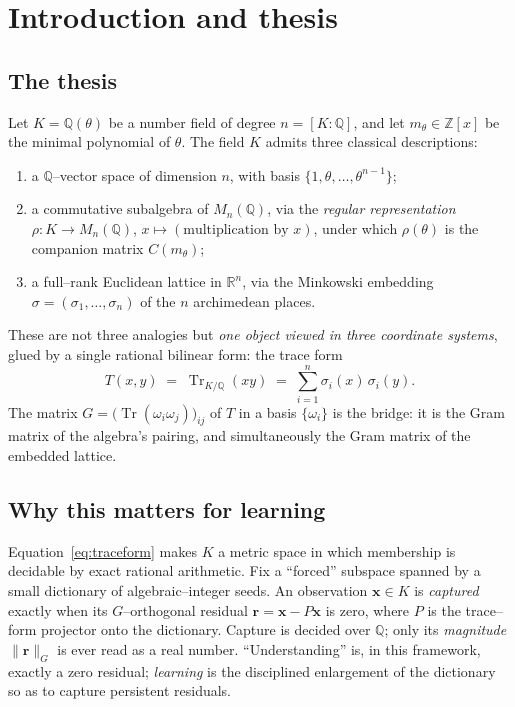 \documentclass[11pt]{article}
\theoremstyle{plain}
\theoremstyle{definition}
\theoremstyle{remark}
\newcommand{\Q}{\mathbb{Q}}
\newcommand{\Z}{\mathbb{Z}}
\newcommand{\R}{\mathbb{R}}
\newcommand{\K}{K}
\newcommand{\Tr}{\operatorname{Tr}}
\newcommand{\rr}{\mathbf{r}}
\newcommand{\xx}{\mathbf{x}}
\newcommand{\GG}{G}
\begin{document}
\tableofcontents

\section{Introduction and thesis}\label{sec:intro}

\subsection*{The thesis}
Let $\K=\Q(\theta)$ be a number field of degree $n=[\K:\Q]$, and let $m_\theta\in\Z[x]$ be the minimal
polynomial of $\theta$. The field $\K$ admits three classical descriptions:
\begin{enumerate}[label=(\roman*)]
  \item a $\Q$--vector space of dimension $n$, with basis $\{1,\theta,\dots,\theta^{n-1}\}$;
  \item a commutative subalgebra of $M_n(\Q)$, via the \emph{regular representation}
        $\rho\colon \K\to M_n(\Q)$, $x\mapsto(\text{multiplication by }x)$, under which $\rho(\theta)$ is
        the companion matrix $C(m_\theta)$;
  \item a full--rank Euclidean lattice in $\R^n$, via the Minkowski embedding
        $\sigma=(\sigma_1,\dots,\sigma_n)$ of the $n$ archimedean places.
\end{enumerate}
These are not three analogies but \emph{one object viewed in three coordinate systems}, glued by a single
rational bilinear form: the trace form
\begin{equation}\label{eq:traceform}
  T(x,y) \;=\; \Tr_{\K/\Q}(xy) \;=\; \sum_{i=1}^{n}\sigma_i(x)\,\sigma_i(y).
\end{equation}
The matrix $\GG=\big(\Tr(\omega_i\omega_j)\big)_{ij}$ of $T$ in a basis $\{\omega_i\}$ is the bridge: it is
the Gram matrix of the algebra's pairing, and simultaneously the Gram matrix of the embedded lattice.

\subsection*{Why this matters for learning}
Equation~\eqref{eq:traceform} makes $\K$ a metric space in which membership is decidable by exact rational
arithmetic. Fix a ``forced'' subspace spanned by a small dictionary of algebraic--integer seeds. An
observation $\xx\in\K$ is \emph{captured} exactly when its $\GG$--orthogonal residual $\rr=\xx-P\xx$ is
zero, where $P$ is the trace--form projector onto the dictionary. Capture is decided over $\Q$; only its
\emph{magnitude} $\lVert\rr\rVert_{\GG}$ is ever read as a real number. ``Understanding'' is, in this
framework, exactly a zero residual; \emph{learning} is the disciplined enlargement of the dictionary so as
to capture persistent residuals.
\end{document}

